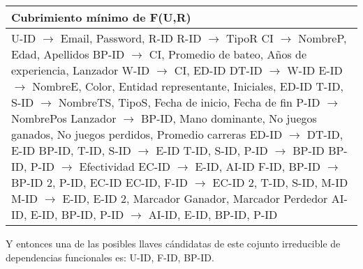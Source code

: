 \documentclass{report}
\begin{document}
    \begin{tabularx}{\textwidth}{|X|}
        \toprule
        \hfil \textbf{Cubrimiento mínimo de F(U,R)} \\
        \midrule
        U-ID $\rightarrow$ Email, Password, R-ID \newline 
        R-ID $\rightarrow$ TipoR \newline 
        CI $\rightarrow$ NombreP, Edad, Apellidos \newline 
        BP-ID $\rightarrow$ CI, Promedio de bateo, Años de experiencia, Lanzador \newline 
        W-ID $\rightarrow$ CI, ED-ID \newline 
        DT-ID $\rightarrow$ W-ID \newline 
        E-ID $\rightarrow$ NombreE, Color, Entidad representante, Iniciales, ED-ID \newline 
        T-ID, S-ID $\rightarrow$ NombreTS, TipoS, Fecha de inicio, Fecha de fin \newline 
        P-ID $\rightarrow$ NombrePos \newline 
        Lanzador $\rightarrow$ BP-ID, Mano dominante, No juegos ganados, No juegos perdidos, Promedio carreras \newline 
        ED-ID $\rightarrow$ DT-ID, E-ID \newline 
        BP-ID, T-ID, S-ID $\rightarrow$ E-ID \newline 
        T-ID, S-ID, P-ID $\rightarrow$ BP-ID \newline 
        BP-ID, P-ID $\rightarrow$ Efectividad \newline 
        EC-ID $\rightarrow$ E-ID, AI-ID \newline 
        F-ID, BP-ID $\rightarrow$ BP-ID 2, P-ID, EC-ID \newline 
        EC-ID, F-ID $\rightarrow$ EC-ID 2, T-ID, S-ID, M-ID \newline 
        M-ID $\rightarrow$ E-ID, E-ID 2, Marcador Ganador, Marcador Perdedor \newline 
        AI-ID, E-ID, BP-ID, P-ID $\rightarrow$ AI-ID, E-ID, BP-ID, P-ID \newline \\ 
        \bottomrule
    \end{tabularx}

    \newpage 

    Y entonces una de las posibles llaves cándidatas de este cojunto irreducible de dependencias funcionales es: U-ID, F-ID, BP-ID. \newline
\end{document}

